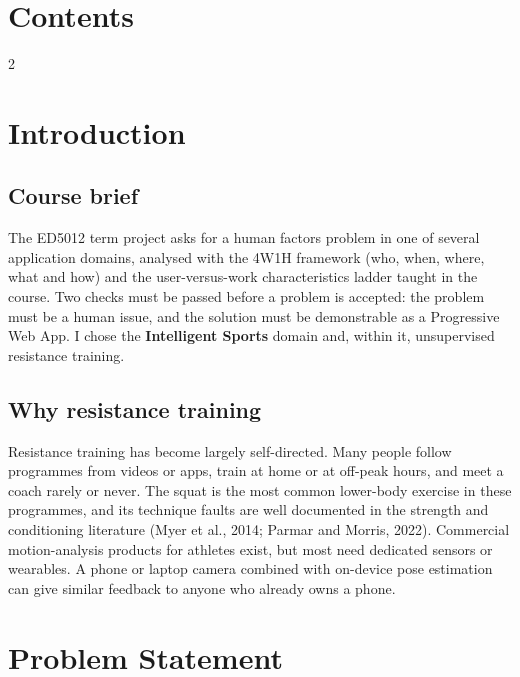\documentclass[12pt]{article}
\newcommand{\key}[1]{\textcolor{keyred}{\textbf{#1}}}
\begin{document}
\setcounter{tocdepth}{1}
\begingroup\setlength{\parskip}{0pt}\small
\renewcommand{\contentsname}{}
\section*{Contents}\vspace{-2.2em}
\begin{multicols}{2}
\tableofcontents
\end{multicols}
\endgroup
\newpage

\section{Introduction}

\subsection{Course brief}

The ED5012 term project asks for a human factors problem in one of several application domains, analysed with the 4W1H framework (who, when, where, what and how) and the user-versus-work characteristics ladder taught in the course. Two checks must be passed before a problem is accepted: the problem must be a human issue, and the solution must be demonstrable as a Progressive Web App. I chose the \key{Intelligent Sports} domain and, within it, unsupervised resistance training.

\subsection{Why resistance training}

Resistance training has become largely self-directed. Many people follow programmes from videos or apps, train at home or at off-peak hours, and meet a coach rarely or never. The squat is the most common lower-body exercise in these programmes, and its technique faults are well documented in the strength and conditioning literature (Myer et al., 2014; Parmar and Morris, 2022). Commercial motion-analysis products for athletes exist, but most need dedicated sensors or wearables. A phone or laptop camera combined with on-device pose estimation can give similar feedback to anyone who already owns a phone.

\section{Problem Statement}
\end{document}
